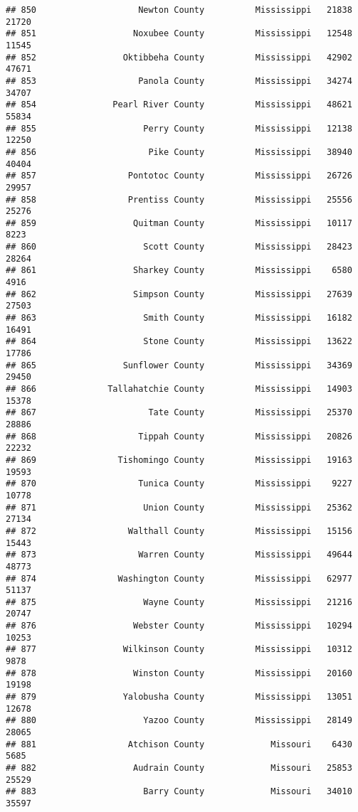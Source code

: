 \documentclass[
]{article}
\begin{document}
\begin{verbatim}
## 850                    Newton County          Mississippi   21838   21720
## 851                   Noxubee County          Mississippi   12548   11545
## 852                 Oktibbeha County          Mississippi   42902   47671
## 853                    Panola County          Mississippi   34274   34707
## 854               Pearl River County          Mississippi   48621   55834
## 855                     Perry County          Mississippi   12138   12250
## 856                      Pike County          Mississippi   38940   40404
## 857                  Pontotoc County          Mississippi   26726   29957
## 858                  Prentiss County          Mississippi   25556   25276
## 859                   Quitman County          Mississippi   10117    8223
## 860                     Scott County          Mississippi   28423   28264
## 861                   Sharkey County          Mississippi    6580    4916
## 862                   Simpson County          Mississippi   27639   27503
## 863                     Smith County          Mississippi   16182   16491
## 864                     Stone County          Mississippi   13622   17786
## 865                 Sunflower County          Mississippi   34369   29450
## 866              Tallahatchie County          Mississippi   14903   15378
## 867                      Tate County          Mississippi   25370   28886
## 868                    Tippah County          Mississippi   20826   22232
## 869                Tishomingo County          Mississippi   19163   19593
## 870                    Tunica County          Mississippi    9227   10778
## 871                     Union County          Mississippi   25362   27134
## 872                  Walthall County          Mississippi   15156   15443
## 873                    Warren County          Mississippi   49644   48773
## 874                Washington County          Mississippi   62977   51137
## 875                     Wayne County          Mississippi   21216   20747
## 876                   Webster County          Mississippi   10294   10253
## 877                 Wilkinson County          Mississippi   10312    9878
## 878                   Winston County          Mississippi   20160   19198
## 879                 Yalobusha County          Mississippi   13051   12678
## 880                     Yazoo County          Mississippi   28149   28065
## 881                  Atchison County             Missouri    6430    5685
## 882                   Audrain County             Missouri   25853   25529
## 883                     Barry County             Missouri   34010   35597

\end{verbatim}
\end{document}
